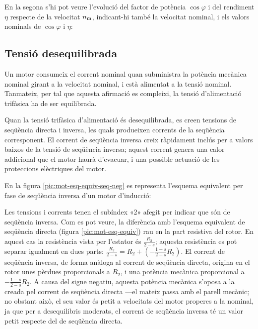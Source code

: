 \begin{exemple}
	En la segona s'hi pot veure l'evolució del factor de potència $\cos\varphi$ i del rendiment $\eta$ respecte de la velocitat $n_\mathrm{m}$, indicant-hi també la  velocitat nominal, i els valors nominals de $\cos\varphi$ i $\eta$:
	\vspace{-3mm}
	\begin{center}
	\fontsize{10pt}{11pt}\selectfont
	
	\end{center}	

\end{exemple}

\subsection{Tensió desequilibrada}\label{sec:mot-tens-deseq}

Un motor consumeix el corrent nominal quan subministra la potència mecànica nominal girant a la velocitat nominal, i està alimentat a la tensió nominal. Tanmateix, per tal que aquesta afirmació es compleixi, la tensió d'alimentació trifàsica ha de ser equilibrada.

Quan la tensió trifàsica d'alimentació és desequilibrada, es creen tensions de seqüència directa i inversa, les quals  produeixen corrents de la seqüència corresponent. El corrent de seqüència inversa creix ràpidament inclús per a valors baixos de  la tensió de seqüència inversa; aquest corrent genera una calor addicional que el motor haurà d'evacuar, i una possible actuació de les proteccions elèctriques del motor.

En la figura \vref{pic:mot-esq-equiv-seq-neg} es representa l'esquema equivalent per fase de seqüència inversa d'un   motor d'inducció:
\vspace{-2mm}
\begin{center}
	
	\label{pic:mot-esq-equiv-seq-neg}
\end{center}

Les tensions i corrents tenen el subíndex «2» afegit per indicar que són de seqüència inversa. Com es pot veure, la diferència amb l'esquema equivalent de seqüència directa (figura \vref{pic:mot-esq-equiv}) rau en la part resistiva del rotor. En aquest cas la resistència vista per l'estator és $\frac{R_2}{2-s}$; aquesta resistència es pot separar igualment en dues parts: $\frac{R_2}{2-s} = R_2 + \left(-\frac{1-s}{2-s} R_2\right)$. El corrent de seqüència inversa, de forma anàloga al corrent de seqüència directa,  origina en el rotor unes pèrdues proporcionals a  $R_2$, i una potència mecànica proporcional a $- \frac{1-s}{2-s} R_2$. A causa del signe negatiu, aquesta potència mecànica  s'oposa a la  creada pel corrent de seqüència directa ---el mateix passa amb el parell mecànic; no obstant això, el seu valor és petit a velocitats del motor properes a la nominal, ja que per a desequilibris moderats, el corrent de seqüència inversa té un valor petit respecte del de seqüència directa.

